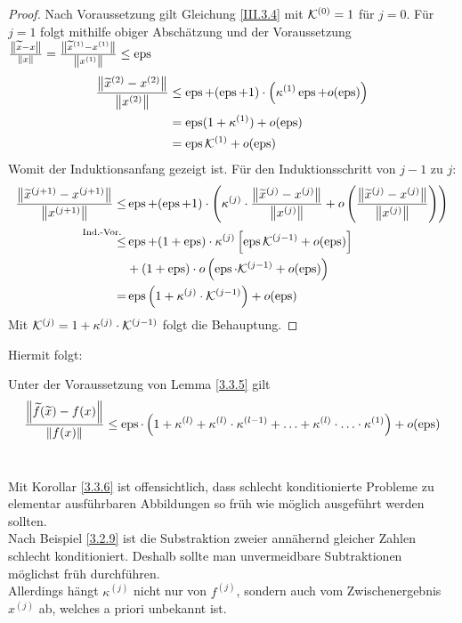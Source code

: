 \begin{Leme}[Fehlerfortpflanzung]
\begin{proof}
  Nach Voraussetzung gilt Gleichung \eqref{III.3.4}  mit $\K^{(0)}=1$ für $j=0$.
  Für $j=1$ folgt mithilfe obiger Abschätzung und der Voraussetzung 
  $\frac{\nn[\widetilde{x}-x]}{\nn[x]} 
  = \frac{\nn[\widetilde{x}^{(1)}-x^{(1)}]}{\nn[x^{(1)}]}\leq \Eps$ 
  \begin{align*}
    \frac{\nn[\widetilde{x}^{(2)}-x^{(2)}]}{\nn[x^{(2)}]}
    & \leq \Eps +(\Eps+1) \cdot \left( \kappa^{(1)}\Eps+ o(\Eps)\right) \\
    &= \Eps(1+\kappa^{(1)}) + o(\Eps) \\
    &= \Eps\K^{(1)} + o(\Eps)
  \end{align*}
  Womit der Induktionsanfang gezeigt ist.
  Für den Induktionsschritt von $j-1$ zu $j$:
  \begin{align*}
    \frac{\nn[\widetilde{x}^{(j+1)}-x^{(j+1)}]}{\nn[x^{(j+1)}]}
    \leq& \Eps + (\Eps+1) \cdot
          \left(
          \kappa^{(j)}\cdot \frac{\nn[\widetilde{x}^{(j)}-x^{(j)}]}{\nn[x^{(j)}]}
          + o\left( 
          \frac{\nn[\widetilde{x}^{(j)}-x^{(j)}]}{\nn[x^{(j)}]}
          \right)
          \right)\\
    \overset{\mathllap{\text{Ind.-Vor.}}}{\leq}
    & \Eps + (1+\Eps)
      \cdot\kappa^{(j)} \left[ \Eps \K^{(j-1)}+ o(\Eps) \right] \\
        &+ (1+\Eps) \cdot o\left( \Eps\cdot \K^{(j-1)} +o(\Eps)\right) \\
    =& \Eps\left(1+\kappa^{(j)}\cdot \K^{(j-1)}\right)+ o(\Eps)
  \end{align*}
  Mit $\K^{(j)} = 1+ \kappa^{(j)}\cdot \K^{(j-1)}$ folgt die Behauptung.
\end{proof}
\end{Leme}

Hiermit folgt:

\begin{Kore}
  \label{3.3.6}
  Unter der Voraussetzung von Lemma \ref{3.3.5} gilt
  \begin{gather}
    \frac{\nn[\widetilde{f}(\widetilde{x})-f(x)]}{\nn[f(x)]} \leq 
    \Eps\cdot \left( 1+\kappa^{(l)}+ \kappa^{(l)}\cdot \kappa^{(l-1)}+ \dotsc
      + \kappa^{(l)}\cdot \dotsc \cdot \kappa^{(1)}\right) + o(\Eps) 
    \label{III.3.5}
  \end{gather}~
\end{Kore}

\begin{Beme}
  Mit Korollar \ref{3.3.6} ist offensichtlich, dass schlecht konditionierte Probleme 
  zu elementar ausführbaren Abbildungen so früh wie möglich ausgeführt werden sollten. \\
  Nach Beispiel \ref{3.2.9} ist die Substraktion zweier annähernd gleicher Zahlen schlecht konditioniert.
  Deshalb sollte man unvermeidbare Subtraktionen möglichst früh durchführen. \\
  Allerdings hängt $\kappa^{(j)}$ nicht nur von $f^{(j)}$, sondern auch vom 
  Zwischenergebnis $x^{(j)}$ ab, welches a priori unbekannt ist.
\end{Beme}

